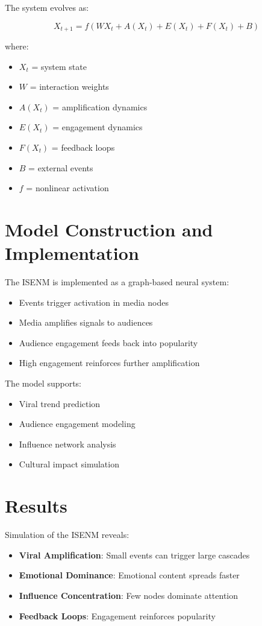\documentclass[12pt]{article}
\begin{document}
The system evolves as:

\[
X_{t+1} = f(WX_t + A(X_t) + E(X_t) + F(X_t) + B)
\]

where:

\begin{itemize}
\item $X_t$ = system state
\item $W$ = interaction weights
\item $A(X_t)$ = amplification dynamics
\item $E(X_t)$ = engagement dynamics
\item $F(X_t)$ = feedback loops
\item $B$ = external events
\item $f$ = nonlinear activation
\end{itemize}

\section{Model Construction and Implementation}

The ISENM is implemented as a graph-based neural system:

\begin{itemize}
\item Events trigger activation in media nodes
\item Media amplifies signals to audiences
\item Audience engagement feeds back into popularity
\item High engagement reinforces further amplification
\end{itemize}

The model supports:

\begin{itemize}
\item Viral trend prediction
\item Audience engagement modeling
\item Influence network analysis
\item Cultural impact simulation
\end{itemize}

\section{Results}

Simulation of the ISENM reveals:

\begin{itemize}
\item \textbf{Viral Amplification}: Small events can trigger large cascades
\item \textbf{Emotional Dominance}: Emotional content spreads faster
\item \textbf{Influence Concentration}: Few nodes dominate attention
\item \textbf{Feedback Loops}: Engagement reinforces popularity
\end{itemize}
\end{document}
